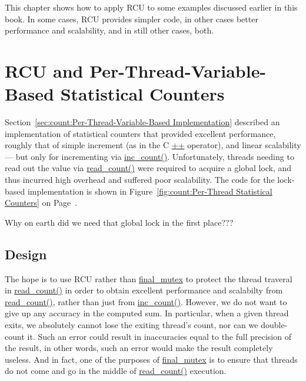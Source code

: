 

This chapter shows how to apply RCU to some examples discussed earlier
in this book.
In some cases, RCU provides simpler code, in other cases better
performance and scalability, and in still other cases, both.

\section{RCU and Per-Thread-Variable-Based Statistical Counters}
\label{sec:count:RCU and Per-Thread-Variable-Based Statistical Counters}

Section~\ref{sec:count:Per-Thread-Variable-Based Implementation}
described an implementation of statistical counters that provided
excellent
performance, roughly that of simple increment (as in the C \url{++}
operator), and linear scalability --- but only for incrementing
via \url{inc_count()}.
Unfortunately, threads needing to read out the value via \url{read_count()}
were required to acquire a global
lock, and thus incurred high overhead and suffered poor scalability.
The code for the lock-based implementation is shown in
Figure~\ref{fig:count:Per-Thread Statistical Counters} on
Page~\pageref{fig:count:Per-Thread Statistical Counters}.

\QuickQuiz{}
	Why on earth did we need that global lock in the first place???
 \QuickQuizEnd

\subsection{Design}

The hope is to use RCU rather than \url{final_mutex} to protect the
thread traveral in \url{read_count()} in order to obtain excellent
performance and scalabilty from \url{read_count()}, rather than just
from \url{inc_count()}.
However, we do not want to give up any accuracy in the computed sum.
In particular, when a given thread exits, we absolutely cannot
lose the exiting thread's count, nor can we double-count it.
Such an error could result in inaccuracies equal to the full
precision of the result, in other words, such an error would
make the result completely useless.
And in fact, one of the purposes of \url{final_mutex} is to
ensure that threads do not come and go in the middle of \url{read_count()}
execution.

